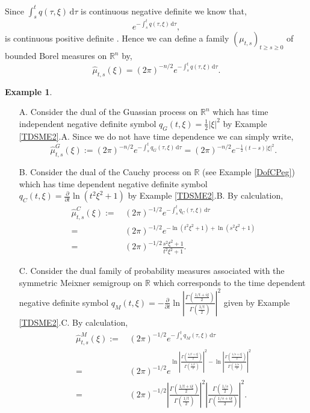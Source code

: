 \documentclass[a4paper, 12pt]{report}
\theoremstyle{remark}
\theoremstyle{definition}
\newtheorem{example}[theorem]{Example}
\begin{document}
Since $\int_s^tq(\tau, \xi)\,\mathrm{d}\tau$ is continuous negative definite we know that,
$$
e^{-\int_s^tq(\tau, \xi)\,\mathrm{d}\tau},
$$
is continuous positive definite \cite[Corollary 3.6.17]{Vol1}.  Hence we can define a family $(\mu_{t, s})_{t \ge s \ge 0}$ of bounded Borel measures on $\mathbb{R}^n$ by,
\begin{equation}
\hat{\mu}_{t, s}(\xi) = (2\pi)^{-n/2}e^{-\int_s^tq(\tau, \xi)\,\mathrm{d}\tau}.\label{FBBM}
\end{equation}
\begin{example}\label{TDSFSE1}
\hspace{0.5cm}
\begin{itemize}
\item[A.] Consider the dual of the Guassian process on $\mathbb{R}^n$ which has time independent negative definite symbol $q_G(t, \xi) = \frac{1}{2}|\xi|^2$ by Example \ref{TDSME2}.A.  Since we do not have time dependence we can simply write,
$$
\hat{\mu}_{t, s}^G(\xi) := (2\pi)^{-n/2}e^{-\int_s^tq_G(\tau, \xi)\,\mathrm{d}\tau} = (2\pi)^{-n/2}e^{-\frac{1}{2}(t - s)|\xi|^2}.
$$

\item[B.] Consider the dual of the Cauchy process on $\mathbb{R}$ (see Example \ref{DofCPeg}) which has time dependent negative definite symbol $q_C(t, \xi) = \frac{\partial}{\partial t}\ln(t^2\xi^2 + 1)$ by Example \ref{TDSME2}.B.  By calculation,
$$
\begin{aligned}
\hat{\mu}_{t, s}^C(\xi) := & \, (2\pi)^{-1/2}e^{-\int_s^tq_C(\tau, \xi)\,\mathrm{d}\tau}\\
= & \, (2\pi)^{-1/2}e^{-\ln(t^2\xi^2 + 1) + \ln(s^2\xi^2 + 1)}\\
= & \, (2\pi)^{-1/2}\frac{s^2\xi^2 + 1}{t^2\xi^2 + 1}.
\end{aligned}
$$

\item[C.] Consider the dual family of probability measures associated with the symmetric Meixner semigroup on $\mathbb{R}$ which corresponds to the time dependent negative definite symbol $q_M(t, \xi) = -\frac{\partial}{\partial t}\ln\left|\frac{\Gamma\left(\frac{1/t + i\xi}{2}\right)}{\Gamma\left(\frac{1/t}{2}\right)}\right|^2$ given by Example \ref{TDSME2}.C.  By calculation,
$$
\begin{aligned}
\hat{\mu}_{t, s}^M(\xi) := & \, (2\pi)^{-1/2}e^{-\int_s^tq_M(\tau, \xi)\,\mathrm{d}\tau}\\
= & \, (2\pi)^{-1/2}e^{\ln\left|\frac{\Gamma\left(\frac{1/t + i\xi}{2}\right)}{\Gamma\left(\frac{1/t}{2}\right)}\right|^2 - \ln\left|\frac{\Gamma\left(\frac{1/s + i\xi}{2}\right)}{\Gamma\left(\frac{1/s}{2}\right)}\right|^2}\\
= & \, (2\pi)^{-1/2}\left|\frac{\Gamma\left(\frac{1/t + i\xi}{2}\right)}{\Gamma\left(\frac{1/t}{2}\right)}\right|^2 \left|\frac{\Gamma\left(\frac{1/s}{2}\right)}{\Gamma\left(\frac{1/s + i\xi}{2}\right)}\right|^2.
\end{aligned}
$$
\end{itemize}
\end{example}
\end{document}
